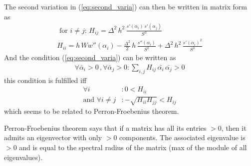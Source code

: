 \documentclass[final,3p,times,authoryear]{elsarticle}
\begin{document}
The second variation in (\ref{eq:second_varia}) can then be written in matrix form as
\begin{subequations}
\begin{align}
\label{eq:second_varia_discrete}
\text{ for } i \neq j: \, H_{ij} = \Delta^2 \, h^2 \,  \frac{s'(\alpha_i) \, s'(\alpha_j)}{S^3} \\
%
H_{ii} = h\, W w''(\alpha_i) - \frac{\Delta^2}{2} \, h \,  \frac{s''(\alpha_i)}{S^2}  + \Delta^2 \, h^2 \,  \frac{s'(\alpha_i)^2}{S^3} \label{eq_Hii}
\end{align}
\end{subequations}
And the condition (\ref{eq:second_varia}) can be written as
\begin{align}
\label{eq:cond_second_varia_discrete}
\forall  \bar{\alpha}_i >0 \, , \forall  \bar{\alpha}_j >0  : \sum_{i,j} H_{ij} \, \bar{\alpha_i} \, \bar{{\alpha_j}} >0
\end{align}
this condition is fulfilled iff 
\begin{subequations}
\begin{align}
\label{eq:cond_second_varia_discrete_bis}
\forall  i  &:  0 < H_{ii}  \\
\text{and } \forall  i \neq j  &:  - \sqrt{H_{ii} H_{jj} } < H_{ij}
\end{align}
\end{subequations}
which seems to be related to Perron-Froebenius theorem.

Perron-Froebenius theorem says that if a matrix has all its entries $>0$, then it admits an eigenvector with only $>0$ components. The associated eigenvalue is $>0$ and is equal to the spectral radius of the matrix (max of the module of all eigenvalues).


%
%
%
%
%
%
%
\end{document}
